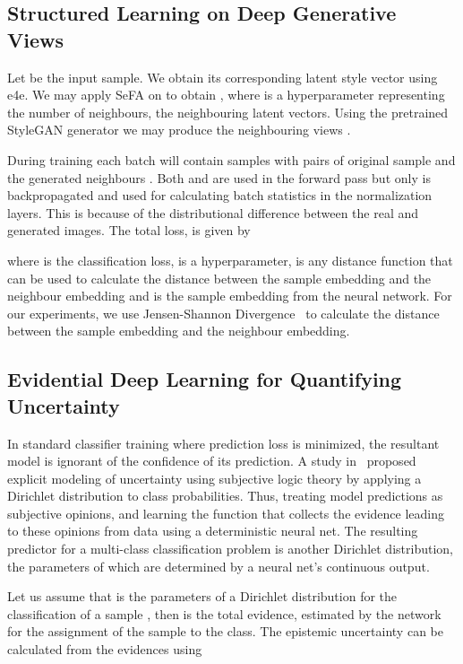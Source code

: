 \documentclass[runningheads]{llncs}
\begin{document}
\subsection{Structured Learning on Deep Generative Views}
Let  be the input sample. We obtain its corresponding latent style vector  using e4e. We may apply SeFA on  to obtain , where  is a hyperparameter representing the number of neighbours, the neighbouring latent vectors. Using the pretrained StyleGAN generator we may produce the neighbouring views .

During training each batch will contain samples with pairs of original sample  and the generated neighbours . Both  and  are used in the forward pass but only  is backpropagated and used for calculating batch statistics in the normalization layers. This is because of the distributional difference between the real and generated images. The total loss,  is given by

where  is the classification loss,  is a hyperparameter,  is any distance function that can be used to calculate the distance between the sample embedding and the neighbour embedding and  is the sample embedding from the neural network. For our experiments, we use Jensen-Shannon Divergence~\cite{jsdiv} to calculate the distance between the sample embedding and the neighbour embedding.

\subsection{Evidential Deep Learning for Quantifying Uncertainty}
In standard classifier training where prediction loss is minimized, the resultant model is ignorant of the confidence of its prediction. A study in~\cite{edl} proposed explicit modeling of uncertainty using subjective logic theory by applying a Dirichlet distribution to class probabilities. Thus, treating model predictions as subjective opinions, and learning the function that collects the evidence leading to these opinions from data using a deterministic neural net. The resulting predictor for a multi-class classification problem is another Dirichlet distribution, the parameters of which are determined by a neural net's continuous output. 

Let us assume that  is the parameters of a Dirichlet distribution for the classification of a sample , then  is the total evidence,  estimated by the network for the assignment of the sample  to the  class. The epistemic uncertainty can be calculated from the evidences  using 
\end{document}
